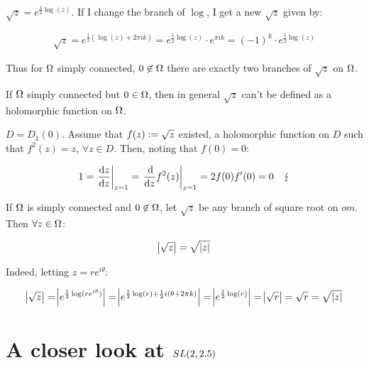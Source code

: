 
 \begin{example}
 $\sqrt{z} = e^ { \frac{1}{2}\log(z)}$. If I change the branch of $\log$, I get a new $\sqrt{z}$ given by: 
 
 \begin{align*}
 \sqrt{z} = e^{ \frac{1}{2} (\log(z)  + 2 \pi i k)} =  e^{\frac{1}{2} \log(z)} \cdot e^{\pi i k} = (-1)^k \cdot e^{\frac{1}{2} \log(z)}
 \end{align*}
 
 Thus for $\Omega$ simply connected, $0 \not\in \Omega$ there are exactly two branches of $\sqrt{z}$ on $\Omega$.
 \end{example}
 
 \begin{remark}
 If $\Omega$ simply connected but $0 \in \Omega$, then in general $\sqrt{z}$ can't be defined as a holomorphic function on $\Omega$.
 \end{remark}
 
 \begin{example}
 $D=D_1(0)$. Assume that $f(z) \vcentcolon = \sqrt{z}$ existed, a holomorphic function on $D$ such that $f^2(z) = z$, $\forall z \in D$. Then, noting that $f(0) = 0$:
 
 \begin{align*}
     1 = \left. \frac{\dif z }{\dif z}  \right|_{z=1} = \left. \frac{\dif }{\dif z} f^2(z)  \right|_{z=1} = 2 f(0) f'(0) = 0  \quad \lightning
 \end{align*}
 \end{example}
 
 \begin{remark}
 If $\Omega$ is simply connected and $0 \not\in \Omega$, let $\sqrt{z}$ be any branch of square root on $
 om$. Then $\forall z \in \Omega$:
 
 \begin{align*}
     \abs{\sqrt{z}} = \sqrt{ \phantom{} \abs{z}}
 \end{align*}
 
 Indeed, letting $z = re^{i \theta}$:
 
 \begin{align*}
     \abs{\sqrt{z}} = \abs{e^{\frac{1}{2} \log(re^{i \theta})}} = \abs{e^{\frac{1}{2} \log(r) + \frac{1}{2} i(\theta + 2 \pi k)}} =  \abs{e^{\frac{1}{2} \log(r)}} = \abs{\sqrt{r}} = \sqrt{r} = \sqrt{ \phantom{} \abs{z}}
 \end{align*}
 \end{remark}
 
\section{A closer look at $SL(2,2.5) $}
 
